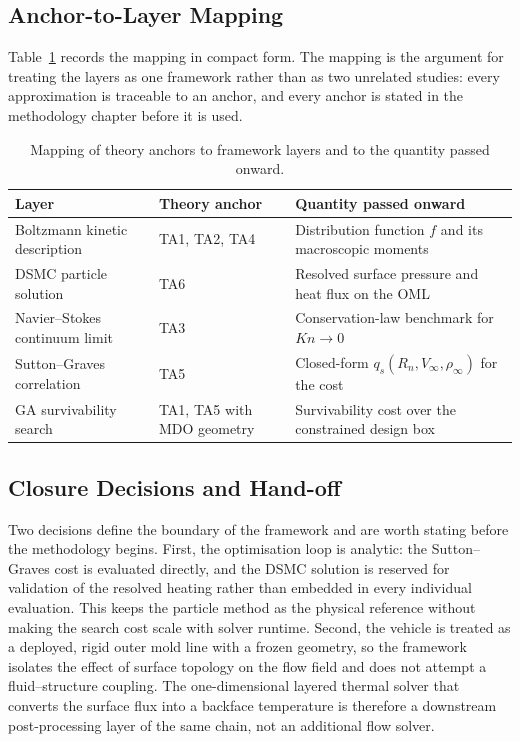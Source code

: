 \subsection{Anchor-to-Layer Mapping}

Table~\ref{tab:framework_layer_map} records the mapping in compact form. The mapping is the argument for treating the layers as one framework rather than as two unrelated studies: every approximation is traceable to an anchor, and every anchor is stated in the methodology chapter before it is used.

\begin{table}[htbp]
\centering
\caption{Mapping of theory anchors to framework layers and to the quantity passed onward.}
\label{tab:framework_layer_map}
\begin{tabularx}{\textwidth}{@{}l >{\RaggedRight\arraybackslash}X >{\RaggedRight\arraybackslash}X@{}}
\toprule
\textbf{Layer} & \textbf{Theory anchor} & \textbf{Quantity passed onward} \\ \midrule
Boltzmann kinetic description & TA1, TA2, TA4 & Distribution function $f$ and its macroscopic moments \\
DSMC particle solution & TA6 & Resolved surface pressure and heat flux on the OML \\
Navier--Stokes continuum limit & TA3 & Conservation-law benchmark for $Kn \to 0$ \\
Sutton--Graves correlation & TA5 & Closed-form $q_s(R_n,V_\infty,\rho_\infty)$ for the cost \\
GA survivability search & TA1, TA5 with MDO geometry & Survivability cost over the constrained design box \\
\bottomrule
\end{tabularx}
\end{table}

\subsection{Closure Decisions and Hand-off}

Two decisions define the boundary of the framework and are worth stating before the methodology begins. First, the optimisation loop is analytic: the Sutton--Graves cost is evaluated directly, and the DSMC solution is reserved for validation of the resolved heating rather than embedded in every individual evaluation. This keeps the particle method as the physical reference without making the search cost scale with solver runtime. Second, the vehicle is treated as a deployed, rigid outer mold line with a frozen geometry, so the framework isolates the effect of surface topology on the flow field and does not attempt a fluid--structure coupling. The one-dimensional layered thermal solver that converts the surface flux into a backface temperature is therefore a downstream post-processing layer of the same chain, not an additional flow solver.

